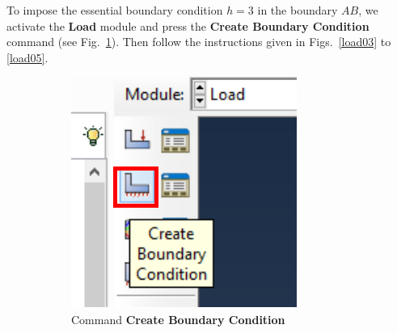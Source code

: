   To impose the essential boundary condition $h=3$ in the boundary
  $AB$, we activate the \textbf{Load} module and press the
  \textbf{Create Boundary Condition} command (see
  Fig.~\ref{load02}). Then follow the instructions given in
  Figs.~\ref{load03} to \ref{load05}.

  \begin{figure}[!h]
    \centering
    \begin{subfigure}[!h]{0.25\textwidth}
      \includegraphics[width=\textwidth]{./body/images/load02.pdf}
      \caption{Command \textbf{Create Boundary Condition}}
      \label{load02}
    \end{subfigure}%
    ~ %
    \begin{subfigure}[!h]{0.45\textwidth}

\end{subfigure}
\end{figure}
